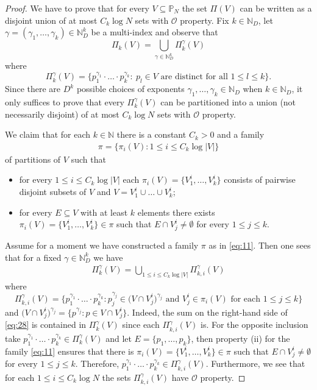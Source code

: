 \documentclass[a4paper,oneside]{amsart}
\theoremstyle{plain}
\theoremstyle{definition}
\numberwithin{equation}{section}
\theoremstyle{plain}
\newcommand{\NN}{\mathbb{N}}
\newcommand{\8}{\infty}
\begin{document}
\begin{proof}
  We have to prove that for every $V\subseteq \mathbb P_N$ the set
  $\Pi(V)$ can be written as a disjoint union of at most $C_k\log N$
  sets with $\mathcal O$ property. Fix $k\in\NN_D$, let 
  $\gamma=(\gamma_1,\ldots,\gamma_k)\in\NN_D^k$ be a multi-index
  and observe that 
\[
\Pi_k(V)=\bigcup_{\gamma\in\NN_D^k}\Pi_k^{\gamma}(V)
\]
where 
\[
\Pi_k^{\gamma}(V)=\big\{p_{1}^{\gamma_1}\cdot\ldots\cdot
p_{k}^{\gamma_k}:\ \text{$p_l\in V$ are distinct for all $1\le l\le k$} \big\}.
\]
Since there are $D^k$ possible choices of exponents
$\gamma_1,\ldots,\gamma_k\in\NN_D$ when $k\in\NN_D$, it only suffices
to prove that every $\Pi_k^{\gamma}(V)$ can be
partitioned into a union (not necessarily disjoint) of at most
$C_k\log N$ sets with  $\mathcal O$ property.

We claim that for each $k\in\NN$ there is a constant $C_k>0$ and a family 
\begin{align}
  \label{eq:11}
\pi=\big\{\pi_i(V): 1\le i\le C_k\log |V|\big\}  
\end{align}
 of partitions of $V$ such that 
 \begin{itemize}
 \item[(i)] 
for every $1\le i\le C_k\log |V|$ 
each $\pi_i(V)=\{V_1^i,\ldots, V_k^i\}$ consists of pairwise disjoint
subsets of $V$
and
$V=V_1^i\cup\ldots\cup V_k^i$; 
\item[(ii)] for every $E\subseteq V$ with at least $k$
elements there exists $\pi_i(V)=\{V_1^i,\ldots, V_k^i\}\in\pi$ such that $E\cap
V_j^i\not=\emptyset$ for every $1\le j\le k$.  
 \end{itemize}
Assume for a moment we have constructed a family $\pi$ as in \eqref{eq:11}. Then one
sees that for a fixed $\gamma\in\NN_D^k$ we have
\begin{align}
  \label{eq:28}
\Pi_k^{\gamma}(V)=\bigcup_{1\le i\le C_{k}\log |V|}\Pi_{k, i}^{\gamma}(V)  
\end{align}
where
\[
\Pi_{k, i}^{\gamma}(V)=\big\{p_{1}^{\gamma_1}\cdot\ldots\cdot
p_{k}^{\gamma_k}:  p_{j}^{\gamma_j}\in \big(V\cap V_j^i)^{\gamma_j}
\text{  and $V_j^i\in\pi_i(V)$ for each $1\le j\le k$}\big\}
\]
and $\big(V\cap V_j^i)^{\gamma_j}=\{p^{\gamma_j}: p\in V\cap V_j^i\}
$. Indeed, the sum on the right-hand side of \eqref{eq:28} is
contained in $\Pi_k^{\gamma}(V)$ since each $\Pi_{k, i}^{\gamma}(V)$
is. For the opposite inclusion take $p_{1}^{\gamma_1}\cdot\ldots\cdot
p_{k}^{\gamma_k}\in\Pi_k^{\gamma}(V)$ and let $E=\{p_1,\ldots, p_k\}$,
then property (ii) for the family \eqref{eq:11} ensures that there is
$\pi_i(V)=\{V_1^i,\ldots, V_k^i\}\in\pi$ such that $E\cap
V_j^i\not=\emptyset$ for every $1\le j\le k$. Therefore,
$p_{1}^{\gamma_1}\cdot\ldots\cdot p_{k}^{\gamma_k}\in\Pi_{k,
  i}^{\gamma}(V)$. Furthermore, we see that for each $1\le i\le C_k\log
N$ the sets $\Pi_{k, i}^{\gamma}(V)$ have $\mathcal O$ property.  


\end{proof}
\end{document}
